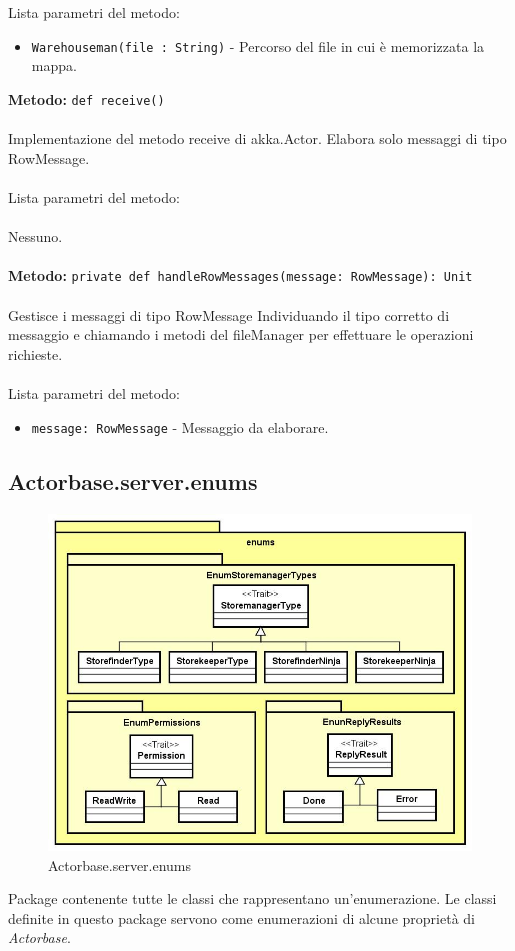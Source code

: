 \documentclass[a4paper]{article}
\begin{document}
			\\ \\
		Lista parametri del metodo:
			\begin{itemize}
				\item \texttt{Warehouseman(file : String)} - Percorso del file in cui è memorizzata la mappa.
			\end{itemize}
		\textbf{Metodo: }\texttt{def receive()}
			\\ \\
		Implementazione del metodo receive di akka.Actor. Elabora solo messaggi di tipo RowMessage.
			\\ \\
		Lista parametri del metodo:
			\\ \\
			Nessuno.
			\\ \\
		\textbf{Metodo: }\texttt{private def handleRowMessages(message: RowMessage): Unit}
			\\ \\
		Gestisce i messaggi di tipo RowMessage Individuando il tipo corretto di messaggio e chiamando i metodi del fileManager per effettuare le operazioni richieste.
			\\ \\
		Lista parametri del metodo:
			\begin{itemize}
				\item \texttt{message: RowMessage} - Messaggio da elaborare.
			\end{itemize}
			
		\subsection{Actorbase.server.enums}
		\begin{figure}[H]
			\centering
			\includegraphics[scale = 0.6]{Server/enumsLevel.jpg}
			\caption{Actorbase.server.enums}
		\end{figure}
		Package contenente tutte le classi che rappresentano un'enumerazione. Le classi definite in questo package servono come enumerazioni di alcune proprietà di \emph{Actorbase}.
		
\end{document}
